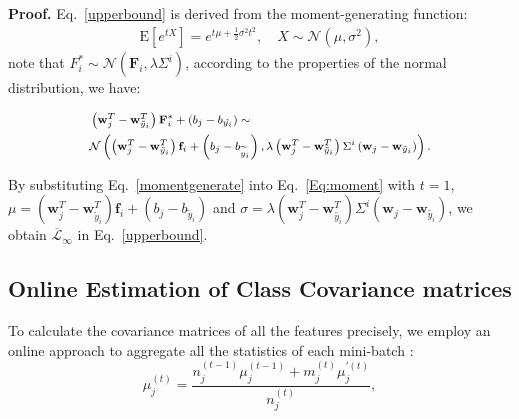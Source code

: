 \documentclass[10pt,journal,compsoc]{IEEEtran}
\begin{document}
\textbf{Proof.} Eq.~\ref{upperbound} is derived from the moment-generating function:
\begin{equation}
\begin{aligned}
\label{Eq:moment}
\mathrm{E}\left[e^{t X}\right]=e^{t \mu+\frac{1}{2} \sigma^{2} t^{2}}, \quad X \sim \mathcal{N}\left(\mu, \sigma^{2}\right),
\end{aligned}
\end{equation}
note that $F^{*}_{i} \sim \mathcal{N}\left(\boldsymbol{F}_{i}, \lambda \Sigma^{{i}}\right)$, according to the properties of the normal distribution, we have:

\begin{equation}
\footnotesize
\begin{aligned}
\label{momentgenerate}
&\left(\mathbf{w}_{j}^{T}-\mathbf{w}_{\tilde{y}_{i}}^{T}\right) \mathbf{F}_{i}^{*}+\left(b_{j}-b_{\tilde{y_{i}}}\right) \notag \sim\\
& \mathcal{N}\left(\left(\mathbf{w}_{j}^{T}-\mathbf{w}_{\tilde{y}_{i}}^{T}\right) \mathbf{f}_{i}+\left(b_{j}-b_{\widetilde{y}_{i}}\right), \lambda\left(\mathbf{w}_{j}^{T}-\mathbf{w}_{\tilde{y}_{i}}^{T}\right) \Sigma^{i}\left(\mathbf{w}_{j}-\mathbf{w}_{\tilde{y}_{i}}\right)\right).
\end{aligned}
\end{equation}

By substituting Eq.~\ref{momentgenerate} into Eq.~\ref{Eq:moment} with $t=1$, $\mu=\left(\boldsymbol{w}_{j}^{T}-\boldsymbol{w}_{\tilde{y}_{i}}^{T}\right) \boldsymbol{f}_{i}+\left(b_{j}-b_{\tilde{y}_{i}}\right)$ and $\sigma=\lambda\left(\boldsymbol{w}_{j}^{T}-\boldsymbol{w}_{\tilde{y_{i}}}^{T}\right) \Sigma^{i}\left(\boldsymbol{w}_{j}-\boldsymbol{w}_{\tilde{y_{i}}}\right)$, we obtain $\overline{\mathcal{L}}_{\infty}$ in Eq.~\ref{upperbound}.

\subsection{Online Estimation of Class Covariance matrices}
\label{sec:DynamicEstimation}
To calculate the covariance matrices of all the features precisely, we employ an online approach to aggregate all the statistics of each mini-batch \cite{ISDATPAMI2021}:
\begin{equation}
\label{mu}
{\mu}_{j}^{(t)}=\frac{n_{j}^{(t-1)} {\mu}_{j}^{(t-1)}+m_{j}^{(t)} {\mu}_{j}^{\prime(t)}}{n_{j}^{(t)}},
\end{equation}
\end{document}
